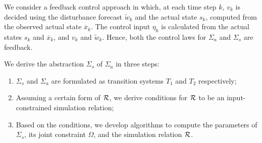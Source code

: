 
We consider a feedback control approach in which, at each time step $k$, $v_{k}$ is decided using the disturbance forecast $\tilde{w}_{k}$ and the actual state $s_{k}$, computed from the observed actual state $\overbar{x}_{k}$.
The control input $\eta_{k}$ is calculated from the actual states $s_{k}$ and $\overbar{x}_{k}$, and $v_{k}$ and $\tilde{w}_{k}$.
Hence, both the control laws for $\Sigma_{a}$ and $\Sigma_{s}$ are feedback.

We derive the abstraction $\Sigma_{s}$ of $\Sigma_{a}$ %
in three steps:
\begin{enumerate}
\item $\Sigma_{s}$ and $\Sigma_{a}$ are formulated as transition systems $T_{1}$ and $T_{2}$ respectively;
\item Assuming a certain form of $\mathcal{R}$, we derive %
  conditions for $\mathcal{R}$ to be an input-constrained simulation relation;
\item Based on the conditions, we develop algorithms to compute the parameters of $\Sigma_{s}$, its joint constraint $\Omega$, and the simulation relation $\mathcal{R}$.
\end{enumerate}
%

